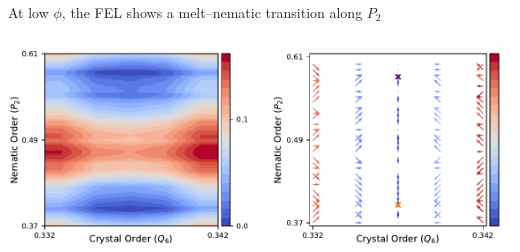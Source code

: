 \documentclass[aspectratio=169]{beamer}
\begin{document}
\begin{frame}[c]{At low $\phi$, the FEL shows a melt--nematic transition along $P_{2}$}

  \begin{columns}[T]

    \centering
    \includegraphics[width=\textwidth]{../figures/fig-pathway_10p75/subfig-pathway_10p75.pdf}

    \centering
    \includegraphics[width=\textwidth]{../figures/ch4_jcp/fig-quivers_10p75/fig-quiver_10.75.pdf}

  \end{columns}

\end{frame}
\end{document}
